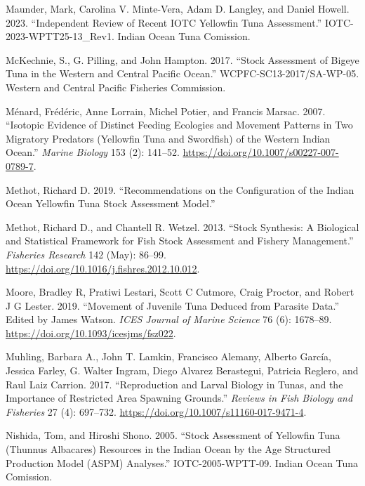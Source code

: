 \documentclass[
]{scrartcl}
\newlength{\cslhangindent}
\newenvironment{CSLReferences}[2] %
 {\begin{list}{}{%
  \setlength{\itemindent}{0pt}
  \setlength{\leftmargin}{0pt}
  \setlength{\parsep}{0pt}
  \ifodd #1
   \setlength{\leftmargin}{\cslhangindent}
   \setlength{\itemindent}{-1\cslhangindent}
  \fi
  \setlength{\itemsep}{#2\baselineskip}}}
 {\end{list}}
\begin{document}
\begin{CSLReferences}{1}{0}
Maunder, Mark, Carolina V. Minte-Vera, Adam D. Langley, and Daniel
Howell. 2023. {``Independent Review of Recent {IOTC} Yellowfin Tuna
Assessment.''} IOTC-2023-WPTT25-13\_Rev1. Indian Ocean Tuna Comission.

McKechnie, S., G. Pilling, and John Hampton. 2017. {``Stock Assessment
of Bigeye Tuna in the Western and Central {Pacific Ocean}.''}
WCPFC-SC13-2017/SA-WP-05. {Western and Central Pacific Fisheries
Commission}.

Ménard, Frédéric, Anne Lorrain, Michel Potier, and Francis Marsac. 2007.
{``Isotopic Evidence of Distinct Feeding Ecologies and Movement Patterns
in Two Migratory Predators (Yellowfin Tuna and Swordfish) of the Western
{Indian Ocean}.''} \emph{Marine Biology} 153 (2): 141--52.
\url{https://doi.org/10.1007/s00227-007-0789-7}.

Methot, Richard D. 2019. {``Recommendations on the Configuration of the
{Indian Ocean} Yellowfin Tuna Stock Assessment Model.''}

Methot, Richard D., and Chantell R. Wetzel. 2013. {``Stock Synthesis:
{A} Biological and Statistical Framework for Fish Stock Assessment and
Fishery Management.''} \emph{Fisheries Research} 142 (May): 86--99.
\url{https://doi.org/10.1016/j.fishres.2012.10.012}.

Moore, Bradley R, Pratiwi Lestari, Scott C Cutmore, Craig Proctor, and
Robert J G Lester. 2019. {``Movement of Juvenile Tuna Deduced from
Parasite Data.''} Edited by James Watson. \emph{ICES Journal of Marine
Science} 76 (6): 1678--89. \url{https://doi.org/10.1093/icesjms/fsz022}.

Muhling, Barbara A., John T. Lamkin, Francisco Alemany, Alberto García,
Jessica Farley, G. Walter Ingram, Diego Alvarez Berastegui, Patricia
Reglero, and Raul Laiz Carrion. 2017. {``Reproduction and Larval Biology
in Tunas, and the Importance of Restricted Area Spawning Grounds.''}
\emph{Reviews in Fish Biology and Fisheries} 27 (4): 697--732.
\url{https://doi.org/10.1007/s11160-017-9471-4}.

Nishida, Tom, and Hiroshi Shono. 2005. {``Stock Assessment of Yellowfin
Tuna ({Thunnus} Albacares) Resources in the {Indian Ocean} by the Age
Structured Production Model ({ASPM}) Analyses.''} IOTC-2005-WPTT-09.
Indian Ocean Tuna Comission.


\end{CSLReferences}
\end{document}
